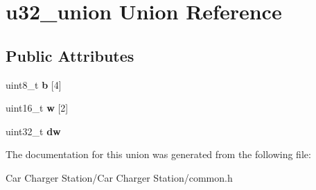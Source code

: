 \hypertarget{unionu32__union}{\section{u32\+\_\+union Union Reference}
\label{unionu32__union}
}
\subsection*{Public Attributes}
\begin{DoxyCompactItemize}
\item 
\hypertarget{unionu32__union_a1242aec7f379706b0d13c41fb4e13c65}{uint8\+\_\+t {\bfseries b} \mbox{[}4\mbox{]}}\label{unionu32__union_a1242aec7f379706b0d13c41fb4e13c65}

\item 
\hypertarget{unionu32__union_a87f0d2f3703a1ea1b699f02eab7e552b}{uint16\+\_\+t {\bfseries w} \mbox{[}2\mbox{]}}\label{unionu32__union_a87f0d2f3703a1ea1b699f02eab7e552b}

\item 
\hypertarget{unionu32__union_ad8e995d2c46dabd3e01319393d1d3ae5}{uint32\+\_\+t {\bfseries dw}}\label{unionu32__union_ad8e995d2c46dabd3e01319393d1d3ae5}

\end{DoxyCompactItemize}


The documentation for this union was generated from the following file\+:\begin{DoxyCompactItemize}
\item 
Car Charger Station/\+Car Charger Station/common.\+h\end{DoxyCompactItemize}
